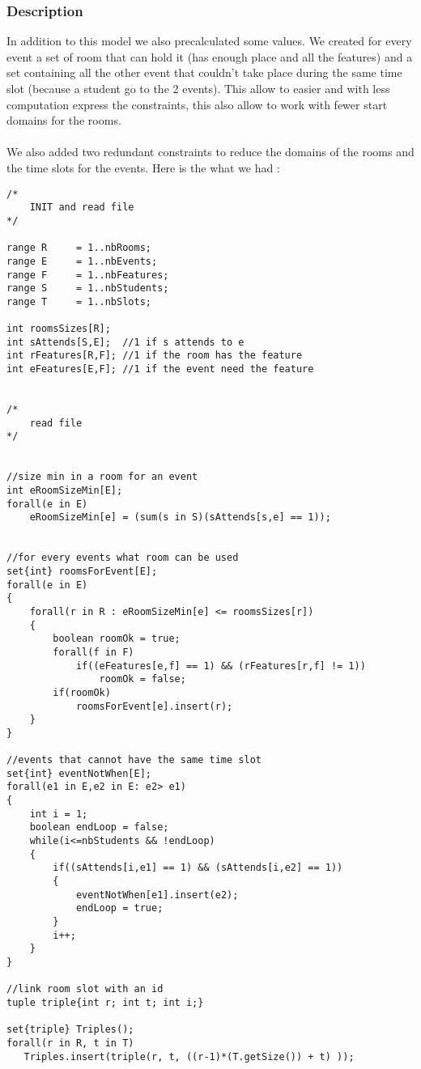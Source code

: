 \documentclass{eplDoc}
\begin{document}
\subsubsection{Description}
In addition to this model we also precalculated some values.  We created for every event a set of room that can hold it (has enough place and all the features) and a set containing all the other event that couldn't take place during the same time slot (because a student go to the 2 events).  This allow to easier and with less computation express the constraints, this also allow to work with fewer start domains for the rooms.
\\\\
We also added two redundant constraints to reduce the domains of the rooms and the time slots for the events.
\newpage
Here is the what we had :
\begin{lstlisting}
/*
    INIT and read file
*/

range R     = 1..nbRooms;
range E     = 1..nbEvents;
range F     = 1..nbFeatures;
range S     = 1..nbStudents;
range T     = 1..nbSlots;

int roomsSizes[R];
int sAttends[S,E];  //1 if s attends to e
int rFeatures[R,F]; //1 if the room has the feature
int eFeatures[E,F]; //1 if the event need the feature


/*
    read file
*/


//size min in a room for an event
int eRoomSizeMin[E];
forall(e in E)
    eRoomSizeMin[e] = (sum(s in S)(sAttends[s,e] == 1));


//for every events what room can be used
set{int} roomsForEvent[E];
forall(e in E)
{
    forall(r in R : eRoomSizeMin[e] <= roomsSizes[r])
    {
        boolean roomOk = true;
        forall(f in F)
            if((eFeatures[e,f] == 1) && (rFeatures[r,f] != 1))
                roomOk = false;
        if(roomOk)
            roomsForEvent[e].insert(r);
    }
}

//events that cannot have the same time slot
set{int} eventNotWhen[E];
forall(e1 in E,e2 in E: e2> e1)
{
    int i = 1;
    boolean endLoop = false;
    while(i<=nbStudents && !endLoop)
    {
        if((sAttends[i,e1] == 1) && (sAttends[i,e2] == 1))
        {
            eventNotWhen[e1].insert(e2);
            endLoop = true;
        }
        i++;
    }
}

//link room slot with an id
tuple triple{int r; int t; int i;}

set{triple} Triples();
forall(r in R, t in T)
   Triples.insert(triple(r, t, ((r-1)*(T.getSize()) + t) ));



\end{lstlisting}
\end{document}

